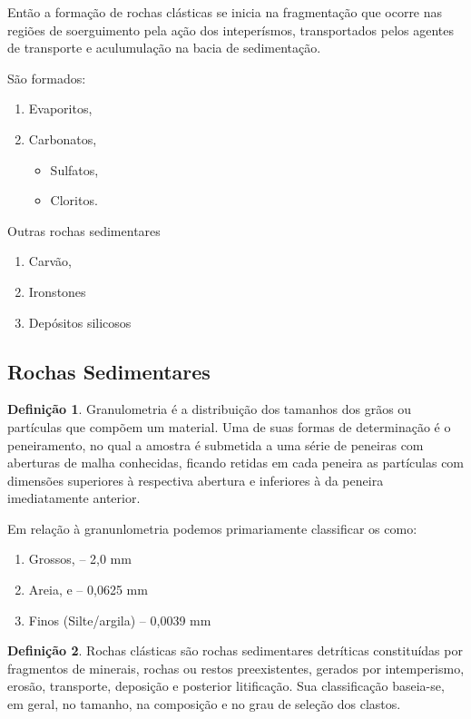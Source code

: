 \documentclass[a4paper,12pt]{article}
\theoremstyle{definition}
\theoremstyle{definition}
\theoremstyle{definition}
\newtheorem{definicao}{Definição}[section]
\begin{document}
Então a formação de rochas clásticas se inicia na fragmentação que ocorre nas regiões de soerguimento pela ação dos inteperísmos, transportados pelos agentes de transporte e aculumulação na bacia de sedimentação.

São formados:

\begin{enumerate}[label=\alph*.]
    \item Evaporitos,
    \item Carbonatos,
        \begin{itemize}
            \item Sulfatos,
            \item Cloritos.
        \end{itemize}
\end{enumerate}

Outras rochas sedimentares
\begin{enumerate}[label=\alph*.]
    \item Carvão,
    \item Ironstones
    \item Depósitos silicosos
\end{enumerate}

\subsection{Rochas Sedimentares}

\begin{definicao}
    
Granulometria é a distribuição dos tamanhos dos grãos ou partículas que compõem um material. Uma de suas formas de determinação é o peneiramento, no qual a amostra é submetida a uma série de peneiras com aberturas de malha conhecidas, ficando retidas em cada peneira as partículas com dimensões superiores à respectiva abertura e inferiores à da peneira imediatamente anterior.
    \end{definicao}
Em relação à granunlometria podemos primariamente classificar os como:
\begin{enumerate}
    \item Grossos,
    -- 2,0 mm
    \item Areia, e
    -- 0,0625 mm
    \item Finos (Silte/argila)
    -- 0,0039 mm
\end{enumerate}

\begin{definicao}
Rochas clásticas são rochas sedimentares detríticas constituídas por fragmentos de minerais, rochas ou restos preexistentes, gerados por intemperismo, erosão, transporte, deposição e posterior litificação. Sua classificação baseia-se, em geral, no tamanho, na composição e no grau de seleção dos clastos.
\end{definicao}
\end{document}
